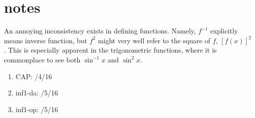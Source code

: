\documentclass[10pt,a4paper]{report}
\begin{document}
%


\chapter*{notes}

An annoying inconsistency exists in defining functions. Namely, $f^{-1}$ explicitly means inverse function, but $f^2$ might very well refer to the square of $f$, $[f(x)]^2$. This is especially apparent in the trigonometric functions, where it is commonplace to see both $\sin^{-1} x$ and $\sin^2 x$.


\begin{enumerate}
	\item CAP: /4/16
	\item inf1-da: /5/16
	\item inf1-op: /5/16
\end{enumerate}
\end{document}

